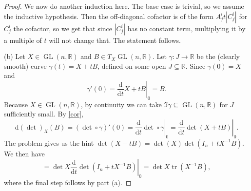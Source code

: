 \documentclass[11pt, letterpaper]{article}
\theoremstyle{plain}
\begin{document}
\begin{proof}
	We now do another induction here. The base case is trivial, so we assume the inductive hypothesis. Then the off-diagonal cofactor is of the form $A^i_jt \left| C_j^i \right| $ for $C^i_j$ the cofactor, so we get that since $\left| C^i_j \right| $ has no constant term, multiplying it by a multiple of $t$ will not change that. The statement follows.

	(b) Let $X\in \operatorname{GL} (n,\mathbb{R} )$ and $B\in T_X \operatorname{GL} (n,\mathbb{R} )$. Let $\gamma : J \to \mathbb{R} $ be the (clearly smooth) curve $\gamma (t)=X+tB$, defined on some open $J\subseteq \mathbb{R} $. Since $\gamma (0)=X$ and
	\[
		\gamma '(0)=\left.\frac{\mathrm{d}}{\mathrm{d}t} X+tB\right|_0 = B
	.\]
	Because $X\in \operatorname{GL} (n,\mathbb{R} )$, by continuity we can take $\Im \gamma \subseteq \operatorname{GL} (n,\mathbb{R} )$ for $J$ sufficiently small. By \cref{cor},
	\[
		\mathrm{d} (\det )_X(B)=(\det \circ \gamma )'(0)=\left. \frac{\mathrm{d}}{\mathrm{d}t} \det \circ \gamma \right|_0 = \left.\frac{\mathrm{d}}{\mathrm{d}t} \det (X+tB)\right|_0
	.\]
	The problem gives us the hint $\det (X+tB)=\det (X)\det (I_n+tX ^{-1} B)$. We then have
	\[
		= \det X \left. \frac{\mathrm{d}}{\mathrm{d}t} \det (I_n +t X ^{-1} B)\right|_0 = \det X \operatorname{tr} (X ^{-1} B)
	,\]
	where the final step follows by part (a).
\end{proof}
\end{document}
